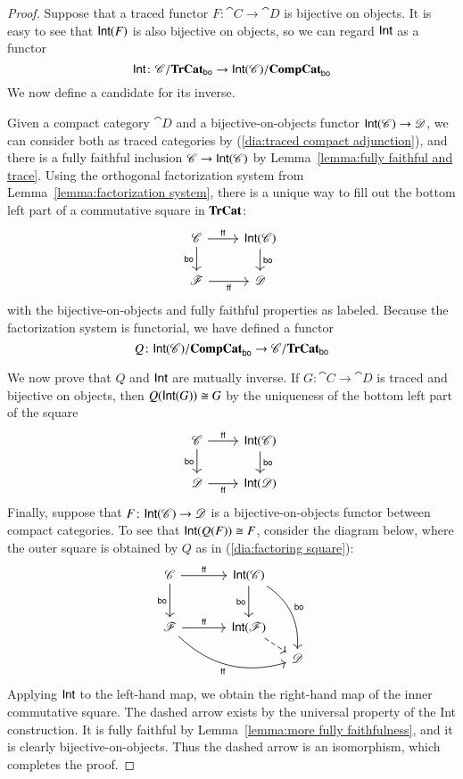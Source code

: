\documentclass[12pt,oneside,article,draft]{memoir}
\begin{document}
\begin{proof}

Suppose that a traced functor $F\colon\cat{C}\to\cat{D}$ is bijective on objects. It is easy to see that $\mathsf{Int}(F)$ is also bijective on objects, so we can regard $\mathsf{Int}$ as a functor 
$$\mathsf{Int}\colon\mathscr{C}/\mathbf{TrCat}_{\mathsf{bo}} \to\mathsf{Int}(\mathscr{C})/\mathbf{CompCat}_{\mathsf{bo}}$$
We now define a candidate for its inverse. 

Given a compact category $\cat{D}$ and a bijective-on-objects functor $\mathsf{Int}(\mathscr{C})\to\mathscr{D}$, we can consider both as traced categories by (\ref{dia:traced compact adjunction}), and there is a fully faithful inclusion $\mathscr{C}\to\mathsf{Int}(\mathscr{C})$ by Lemma~\ref{lemma:fully faithful and trace}. Using the orthogonal factorization system from Lemma~\ref{lemma:factorization system}, there is a unique way to fill out the bottom left part of a commutative square in $\mathbf{TrCat}$:
\begin{equation}\label{dia:factoring square}
\begin{tikzcd}
\cat{C}\arrow[r,"\ff"]\arrow[d,"\bo"']&\Int(\cat{C})\arrow[d,"\bo"]\\
\cat{F}\arrow[r,"\ff"']&\cat{D}
\end{tikzcd}
\end{equation}
with the bijective-on-objects and fully faithful properties as labeled. Because the factorization system is functorial, we have defined a functor
$$Q\colon\mathsf{Int}(\mathscr{C})/\mathbf{CompCat}_{\mathsf{bo}}\to\mathscr{C}/\mathbf{TrCat}_{\mathsf{bo}}$$

We now prove that $Q$ and $\mathsf{Int}$ are mutually inverse. If $G\colon\cat{C}\to\cat{D}$ is traced and bijective on objects, then $Q(\mathsf{Int}(G))\cong G$ by the uniqueness of the bottom left part of the square
$$
\begin{tikzcd}
\cat{C}\arrow[r,"\ff"]\arrow[d,"\bo"']&\Int(\cat{C})\arrow[d,"\bo"]\\
\cat{D}\arrow[r,"\ff"']&\Int(\cat{D})
\end{tikzcd}
$$
Finally, suppose that $F\colon\mathsf{Int}(\mathscr{C})\to\mathscr{D}$ is a bijective-on-objects functor between compact categories. To see that $\mathsf{Int}(Q(F))\cong F$, consider the diagram below, where the outer square is obtained by $Q$ as in (\ref{dia:factoring square}):
$$
\begin{tikzcd}[column sep=small, row sep=small]
\cat{C}\arrow[rr,"\ff"]\arrow[dd,"\bo"']&~&\Int(\cat{C})\arrow[dd,"\bo"']\arrow[dddr,bend left,"\bo"]\\~\\
\cat{F}\arrow[rr,"\ff"]\arrow[drrr,bend right, "\ff"']&&\Int(\cat{F})\arrow[dr,dashed]\\
&&&\cat{D}
\end{tikzcd}
$$
Applying $\mathsf{Int}$ to the left-hand map, we obtain the right-hand map of the inner commutative square. The dashed arrow exists by the universal property of the Int construction. It is fully faithful by Lemma~\ref{lemma:more fully faithfulness}, and it is clearly bijective-on-objects. Thus the dashed arrow is an isomorphism, which completes the proof.


\end{proof}
\end{document}
